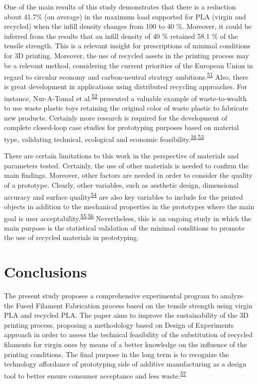 \documentclass[
  12pt]{article}
\begin{document}
One of the main results of this study demonstrates that there is a reduction about 41.7\% (on average) in the maximum load supported for PLA (virgin and recycled) when the infill density changes from 100 to 40 \%.
Moreover, it could be inferred from the results that an infill density of 40 \% retained 58.1 \% of the tensile strength.
This is a relevant insight for prescriptions of minimal conditions for 3D printing. Moreover, the use of recycled assets in the printing process may be a relevant method, considering the current priorities of the European Union in regard to circular economy and carbon-neutral strategy ambitions.\textsuperscript{\protect\hyperlink{ref-Schwarz2021}{51}}
Also, there is great development in applications using distributed recycling approaches. For instance, Nur-A-Tomal et al.\textsuperscript{\protect\hyperlink{ref-Nur-A-Tomal2020}{52}} presented a valuable example of waste-to-wealth to use waste plastic toys retaining the original color of waste plastic to fabricate new products. Certainly more research is required for the development of complete closed-loop case studies for prototyping purposes based on material type, validating technical, ecological and economic feasibility.\textsuperscript{\protect\hyperlink{ref-CruzSanchez2020}{16},\protect\hyperlink{ref-Sauerwein2019}{53}}

There are certain limitations to this work in the perspective of materials and parameters tested.
Certainly, the use of other materials is needed to confirm the main findings.
Moreover, other factors are needed in order to consider the quality of a prototype. Clearly, other variables, such as aesthetic design, dimensional accuracy and surface quality\textsuperscript{\protect\hyperlink{ref-Jin2017}{54}} are also key variables to include for the printed objects in addition to the mechanical properties in the prototypes where the main goal is user acceptability.\textsuperscript{\protect\hyperlink{ref-Sauer2009}{55},\protect\hyperlink{ref-Sauer2010}{56}}
Nevertheless, this is an ongoing study in which the main purpose is the statistical validation of the minimal conditions to promote the use of recycled materials in prototyping.

\hypertarget{section:conclusions}{%
\section{Conclusions}\label{section:conclusions}}

The present study proposes a comprehensive experimental program to analyze the Fused Filament Fabrication process based on the tensile strength using virgin PLA and recycled PLA. The paper aims to improve the sustainability of the 3D printing process, proposing a methodology based on Design of Experiments approach in order to assess the technical feasibility of the substitution of recycled filaments for virgin ones by means of a better knowledge on the influence of the printing conditions. The final purpose in the long term is to recognize the technology affordance of prototyping side of additive manufacturing as a design tool to better ensure consumer acceptance and less waste.\textsuperscript{\protect\hyperlink{ref-Kohtala2015a}{57}}
\end{document}

